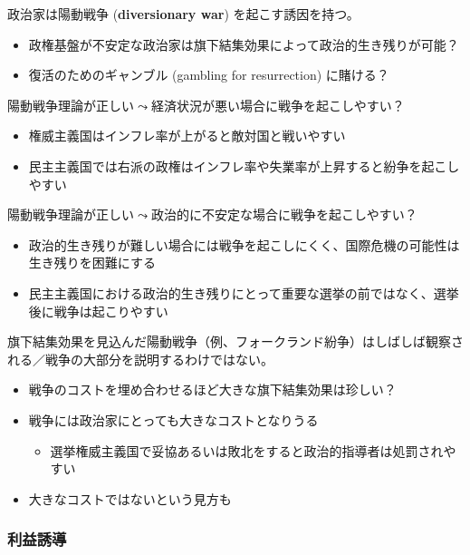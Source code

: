 \documentclass[
  xelatex,
  ja=standard]{bxjsarticle}
\providecommand{\tightlist}{%
  \setlength{\itemsep}{0pt}\setlength{\parskip}{0pt}}\usepackage{longtable,booktabs,array}
\begin{document}
政治家は陽動戦争 (\textbf{diversionary war}) を起こす誘因を持つ。

\begin{itemize}
\tightlist
\item
  政権基盤が不安定な政治家は旗下結集効果によって政治的生き残りが可能？
\item
  復活のためのギャンブル (gambling for resurrection) に賭ける？
\end{itemize}

陽動戦争理論が正しい\(\leadsto\)経済状況が悪い場合に戦争を起こしやすい？

\begin{itemize}
\tightlist
\item
  権威主義国はインフレ率が上がると敵対国と戦いやすい\citep{mitchell2004}
\item
  民主主義国では右派の政権はインフレ率や失業率が上昇すると紛争を起こしやすい\citep{arena2009, fordham1998}
\end{itemize}

陽動戦争理論が正しい\(\leadsto\)政治的に不安定な場合に戦争を起こしやすい？

\begin{itemize}
\tightlist
\item
  政治的生き残りが難しい場合には戦争を起こしにくく、国際危機の可能性は生き残りを困難にする\citep{chiozza2003}
\item
  民主主義国における政治的生き残りにとって重要な選挙の前ではなく、選挙後に戦争は起こりやすい\citep{gaubatz1991}
\end{itemize}

旗下結集効果を見込んだ陽動戦争（例、フォークランド紛争）はしばしば観察される／戦争の大部分を説明するわけではない。

\begin{itemize}
\tightlist
\item
  戦争のコストを埋め合わせるほど大きな旗下結集効果は珍しい？
\item
  戦争には政治家にとっても大きなコストとなりうる\citep{goemans2000}

  \begin{itemize}
  \tightlist
  \item
    選挙権威主義国で妥協あるいは敗北をすると政治的指導者は処罰されやすい
  \end{itemize}
\item
  大きなコストではないという見方も\citep{chiozza2004}
\end{itemize}

\hypertarget{ux5229ux76caux8a98ux5c0e}{%
\subsubsection{利益誘導}\label{ux5229ux76caux8a98ux5c0e}}
\end{document}
